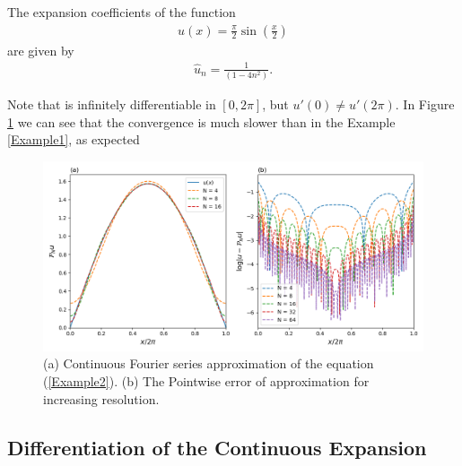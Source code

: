 	\begin{example}
	    The expansion coefficients of the function
    	\begin{align}
    		\label{Example2} 
    	    u(x) = \frac{\pi}{2} \sin(\frac{x}{2})
    	\end{align}
    	are given by
    	\begin{align*}
    	     \hat{u}_{n} = \frac{1}{(1 - 4n^2)}.
    	\end{align*}
    	
    	Note that is infinitely differentiable in $[0, 2 \pi]$, but $u'(0) \ne u' (2 \pi)$. In Figure \ref{fig2} we can see that the convergence is much slower than in the Example \ref{Example1}, as expected	
    	\begin{figure}[H]	
        \includegraphics[width=\textwidth]{preliminaries/figures/example22.png}
        \caption{(a) Continuous Fourier series approximation of the equation (\ref{Example2}). (b) The Pointwise error of approximation for increasing resolution.}
        \label{fig2}
    	\end{figure}
	\end{example} 
	
	\subsection{Differentiation of the Continuous Expansion}

